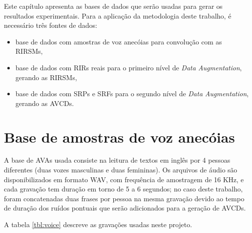 Este capítulo apresenta as bases de dados que serão usadas para gerar os resultados experimentais.
Para a aplicação da metodologia deste trabalho, é necessário três fontes de dados:

\begin{itemize}
    \item base de dados com amostras de voz anecóias para convolução com as RIRSMs,
    \item base de dados com RIRs reais para o primeiro nível de \textit{Data Augmentation}, gerando as RIRSMs,
    \item base de dados com SRPs e SRFs para o segundo nível de \textit{Data Augmentation}, gerando as AVCDs.
\end{itemize}


\section{Base de amostras de voz anecóias}

A base de AVAs usada consiste na leitura de textos em inglês por 4 pessoas diferentes (duas vozes masculinas e duas femininas).
Os arquivos de áudio são disponibilizados em formato WAV, com frequência de amostragem de 16 KHz, e cada gravação tem duração
em torno de 5 a 6 segundos; no caso deste trabalho, foram concatenadas duas frases por pessoa na mesma 
gravação devido ao tempo de duração dos ruídos pontuais que serão adicionados para a geração de AVCDs.

A tabela \ref{tbl:voice} descreve as gravações usadas neste projeto.


